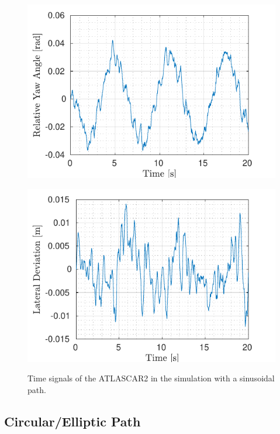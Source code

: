 \begin{figure}[!h]
\begin{minipage}[t]{0.49\textwidth}
		\includegraphics[width=\textwidth]{../../MATLAB/lane_following/figure/RelativeYawAngleVsTime.pdf}
		\label{fig:relative_yaw_angle_laneFollowing}
	\end{minipage}
	\begin{minipage}[t]{0.49\textwidth}
		\includegraphics[width=\textwidth]{../../MATLAB/lane_following/figure/LateralDeviationVsTime.pdf}
		\label{fig:lateral_deviation_laneFollowing}
	\end{minipage}
	\caption{Time signals of the ATLASCAR2 in the simulation with a sinusoidal path.}
	\label{fig:laneFollowing_signals}
\end{figure}


\subsection{Circular/Elliptic Path}


